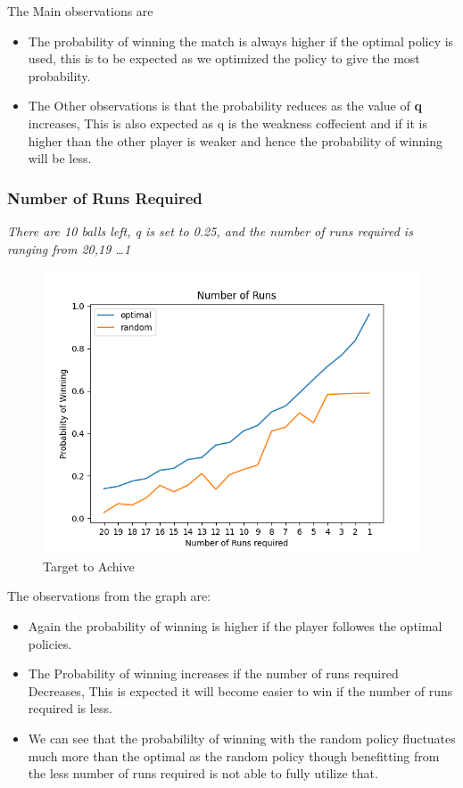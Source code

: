 \documentclass[10pt]{article}
\begin{document}
\vspace*{1em}
The Main observations are
\begin{itemize}
    \item The probability of winning the match is always higher if the optimal policy is used, this is to be expected as we optimized the policy to give the most probability.
    \item The Other observations is that the probability reduces as the value of \textbf{q} increases, This is also expected as q is the weakness coffecient and if it is higher than the other player is weaker and hence the probability of winning will be less.
\end{itemize}

\begin{minipage}{0.9\textwidth}
    \subsubsection{Number of Runs Required}
    \textit{There are 10 balls left, q is set to 0.25, and the number of runs required is ranging from 20,19 \dots 1 }
    \begin{figure}[H]
    \centering
    \includegraphics[scale = 0.9 ]{../Figure_2.png}
    \caption{Target to Achive}
\end{figure}
\end{minipage}

The observations from the graph are:
\begin{itemize}
    \item Again the probability of winning is higher if the player followes the optimal policies.
    \item The Probability of winning increases if the number of runs required Decreases, This is expected it will become easier to win if the number of runs required is less.
    \item We can see that the probabililty of winning with the random policy fluctuates much more than the optimal as the random policy though benefitting from the less number of runs required is not able to fully utilize that.
\end{itemize}
\end{document}
